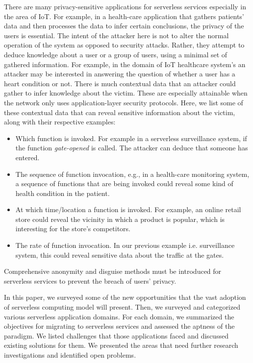 There are many privacy-sensitive applications for serverless services especially in the area of IoT. For example, in a health-care application that gathers patients' data and then processes the data to infer certain conclusions, the privacy of the users is essential. The intent of the attacker here is not to alter the normal operation of the system as opposed to security attacks. Rather, they attempt to deduce knowledge about a user or a group of users, using a minimal set of gathered information. For example, in the domain of IoT healthcare system's an attacker may be interested in answering the question of whether a user has a heart condition or not.
There is much contextual data that an attacker could gather to infer knowledge about the victim. These are especially attainable when the network only uses application-layer security protocols. Here, we list some of these contextual data that can reveal sensitive information about the victim, along with their respective examples:
\begin{itemize}
\item Which function is invoked. For example in a serverless surveillance system, if the function \textit{gate-opened} is called. The attacker can deduce that someone has entered.
\item The sequence of function invocation, e.g., in a health-care monitoring system, a sequence of functions that are being invoked could reveal some kind of health condition in the patient.   
\item At which time/location a function is invoked. For example, an online retail store could reveal the vicinity in which a product is popular, which is interesting for the store's competitors.
\item The rate of function invocation. In our previous example i.e. surveillance system, this could reveal sensitive data about the traffic at the gates.
\end{itemize}
Comprehensive anonymity and disguise methods must be introduced for serverless services to prevent the breach of users' privacy.

In this paper, we surveyed some of the new opportunities that the vast adoption of serverless computing model will present. Then, we surveyed and categorized various serverless application domains. For each domain, we summarized the objectives for migrating to serverless services and assessed the aptness of the paradigm. We listed challenges that those applications faced and discussed existing solutions for them. We presented the areas that need further research investigations and identified open problems.



\endinput